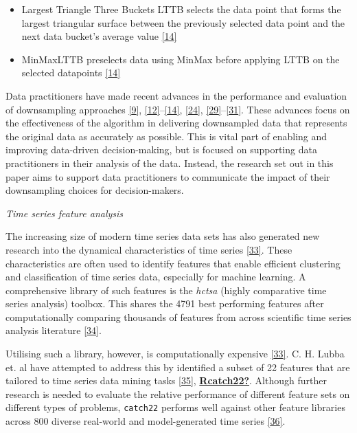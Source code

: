 \documentclass{article}
\providecommand{\tightlist}{%
  \setlength{\itemsep}{0pt}\setlength{\parskip}{0pt}}
\begin{document}
\begin{itemize}
\tightlist
\item
  Largest Triangle Three Buckets LTTB selects the data point that forms
  the largest triangular surface between the previously selected data
  point and the next data bucket's average value
  \protect\hyperlink{ref-MinMaxLTTB}{{[}14{]}}
\item
  MinMaxLTTB preselects data using MinMax before applying LTTB on the
  selected datapoints \protect\hyperlink{ref-MinMaxLTTB}{{[}14{]}}
\end{itemize}

Data practitioners have made recent advances in the performance and
evaluation of downsampling approaches
\protect\hyperlink{ref-datapoint}{{[}9{]}},
\protect\hyperlink{ref-downsampling}{{[}12{]}}--\protect\hyperlink{ref-MinMaxLTTB}{{[}14{]}},
\protect\hyperlink{ref-plotly}{{[}24{]}},
\protect\hyperlink{ref-dashql}{{[}29{]}}--\protect\hyperlink{ref-MinMaxOrdered}{{[}31{]}}.
These advances focus on the effectiveness of the algorithm in delivering
downsampled data that represents the original data as accurately as
possible. This is vital part of enabling and improving data-driven
decision-making, but is focused on supporting data practitioners in
their analysis of the data. Instead, the research set out in this paper
aims to support data practitioners to communicate the impact of their
downsampling choices for decision-makers.

\emph{Time series feature analysis}

The increasing size of modern time series data sets has also generated
new research into the dynamical characteristics of time series
\protect\hyperlink{ref-catch22}{{[}33{]}}. These characteristics are
often used to identify features that enable efficient clustering and
classification of time series data, especially for machine learning. A
comprehensive library of such features is the \emph{hctsa} (highly
comparative time series analysis) toolbox. This shares the 4791 best
performing features after computationally comparing thousands of
features from across scientific time series analysis literature
\protect\hyperlink{ref-fulcher2017}{{[}34{]}}.

Utilising such a library, however, is computationally expensive
\protect\hyperlink{ref-catch22}{{[}33{]}}. C. H. Lubba et. al have
attempted to address this by identified a subset of 22 features that are
tailored to time series data mining tasks
\protect\hyperlink{ref-bagnall}{{[}35{]}},
\protect\hyperlink{ref-Rcatch22}{\textbf{Rcatch22?}}. Although further
research is needed to evaluate the relative performance of different
feature sets on different types of problems, \texttt{catch22} performs
well against other feature libraries across 800 diverse real-world and
model-generated time series \protect\hyperlink{ref-henderson}{{[}36{]}}.
\end{document}
